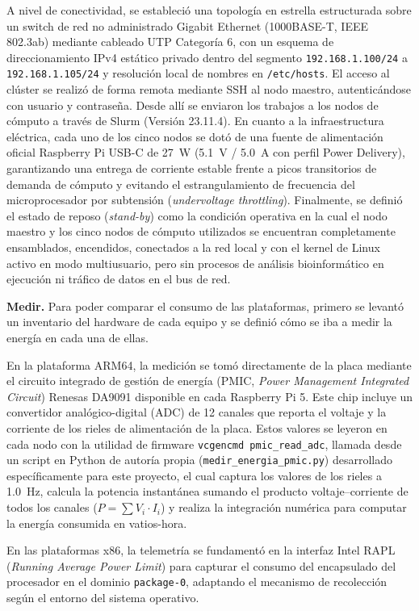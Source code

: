 \documentclass[12pt,oneside,spanish]{book}
\begin{document}
    A nivel de conectividad, se estableció una topología en estrella estructurada sobre un switch de red no administrado Gigabit Ethernet (1000BASE-T, IEEE 802.3ab) mediante cableado UTP Categoría 6, con un esquema de direccionamiento IPv4 estático privado dentro del segmento \texttt{192.168.1.100/24} a \texttt{192.168.1.105/24} y resolución local de nombres en \texttt{/etc/hosts}. El acceso al clúster se realizó de forma remota mediante SSH al nodo maestro, autenticándose con usuario y contraseña. Desde allí se enviaron los trabajos a los nodos de cómputo a través de Slurm (Versión 23.11.4). En cuanto a la infraestructura eléctrica, cada uno de los cinco nodos se dotó de una fuente de alimentación oficial Raspberry Pi USB-C de 27~W (5.1~V / 5.0~A con perfil Power Delivery), garantizando una entrega de corriente estable frente a picos transitorios de demanda de cómputo y evitando el estrangulamiento de frecuencia del microprocesador por subtensión (\textit{undervoltage throttling}). Finalmente, se definió el estado de reposo (\textit{stand-by}) como la condición operativa en la cual el nodo maestro y los cinco nodos de cómputo utilizados se encuentran completamente ensamblados, encendidos, conectados a la red local y con el kernel de Linux activo en modo multiusuario, pero sin procesos de análisis bioinformático en ejecución ni tráfico de datos en el bus de red.
    
    \textbf{Medir.} Para poder comparar el consumo de las plataformas, primero se levantó un inventario del hardware de cada equipo y se definió cómo se iba a medir la energía en cada una de ellas. 
    
    En la plataforma ARM64, la medición se tomó directamente de la placa mediante el circuito integrado de gestión de energía (PMIC, \textit{Power Management Integrated Circuit}) Renesas DA9091 disponible en cada Raspberry Pi 5. Este chip incluye un convertidor analógico-digital (ADC) de 12 canales que reporta el voltaje y la corriente de los rieles de alimentación de la placa. Estos valores se leyeron en cada nodo con la utilidad de firmware \texttt{vcgencmd pmic\_read\_adc}, llamada desde un script en Python de autoría propia (\texttt{medir\_energia\_pmic.py}) desarrollado específicamente para este proyecto, el cual captura los valores de los rieles a 1.0~Hz, calcula la potencia instantánea sumando el producto voltaje--corriente de todos los canales ($P = \sum V_i \cdot I_i$) y realiza la integración numérica para computar la energía consumida en vatios-hora.
    
    En las plataformas x86, la telemetría se fundamentó en la interfaz Intel RAPL (\textit{Running Average Power Limit}) para capturar el consumo del encapsulado del procesador en el dominio \texttt{package-0}, adaptando el mecanismo de recolección según el entorno del sistema operativo.
    
\end{document}
